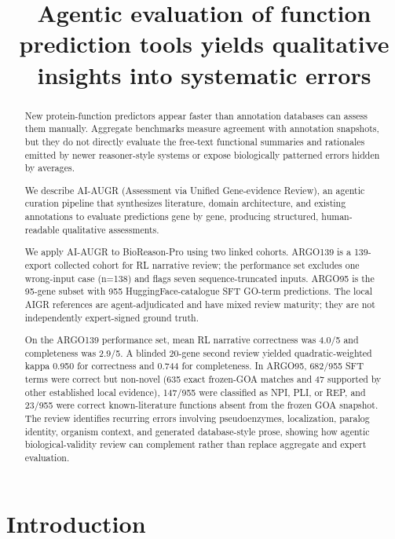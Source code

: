 \documentclass[
  11pt,
]{article}
\title{Agentic evaluation of function prediction tools yields qualitative
insights into systematic errors}
\date{}
\begin{document}
\maketitle

\begin{abstract}
New protein-function predictors appear faster than annotation databases
can assess them manually. Aggregate benchmarks measure agreement with
annotation snapshots, but they do not directly evaluate the free-text
functional summaries and rationales emitted by newer reasoner-style
systems or expose biologically patterned errors hidden by averages.

We describe AI-AUGR (Assessment via Unified Gene-evidence
Review), an agentic curation pipeline that synthesizes literature,
domain architecture, and existing annotations to evaluate predictions
gene by gene, producing structured, human-readable qualitative
assessments.

We apply AI-AUGR to BioReason-Pro using two linked cohorts. ARGO139 is a
139-export collected cohort for RL narrative review; the performance set
excludes one wrong-input case (n=138) and flags seven sequence-truncated
inputs. ARGO95 is the 95-gene subset with 955 HuggingFace-catalogue SFT
GO-term predictions. The local AIGR references are agent-adjudicated and
have mixed review maturity; they are not independently expert-signed
ground truth.

On the ARGO139 performance set, mean RL narrative correctness was 4.0/5
and completeness was 2.9/5. A blinded 20-gene second review yielded
quadratic-weighted kappa 0.950 for correctness and 0.744 for
completeness. In ARGO95, 682/955 SFT terms were correct but non-novel
(635 exact frozen-GOA matches and 47 supported by other established local evidence),
147/955 were classified as NPI, PLI, or REP, and 23/955 were correct
known-literature functions absent from the frozen GOA snapshot. The
review identifies recurring errors involving pseudoenzymes, localization,
paralog identity, organism context, and generated database-style prose,
showing how agentic biological-validity review can complement rather than
replace aggregate and expert evaluation.

\end{abstract}

\hypertarget{introduction}{%
\section{Introduction}\label{introduction}}
\end{document}
